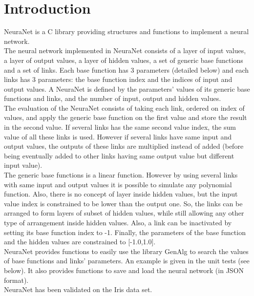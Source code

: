 \section*{Introduction}

NeuraNet is a C library providing structures and functions to implement a neural network.\\ 

The neural network implemented in NeuraNet consists of a layer of input values, a layer of output values, a layer of hidden values, a set of generic base functions and a set of links. Each base function has 3 parameters (detailed below) and each links has 3 parameters: the base function index and the indices of input and output values. A NeuraNet is defined by the parameters' values of its generic base functions and links, and the number of input, output and hidden values.\\

The evaluation of the NeuraNet consists of taking each link, ordered on index of values, and apply the generic base function on the first value and store the result in the second value. If several links has the same second value index, the sum value of all these links is used. However if several links have same input and output values, the outputs of these links are multiplied instead of added (before being eventually added to other links having same output value but different input value).\\

The generic base functions is a linear function. However by using several links with same input and output values it is possible to simulate any polynomial function. Also, there is no concept of layer inside hidden values, but the input value index is constrained to be lower than the output one. So, the links can be arranged to form layers of subset of hidden values, while still allowing any other type of arrangement inside hidden values. Also, a link can be inactivated by setting its base function index to -1. Finally, the parameters of the base function and the hidden values are constrained to [-1.0,1.0].\\

NeuraNet provides functions to easily use the library GenAlg to search the values of base functions and links' parameters. An example is given in the unit tests (see below). It also provides functions to save and load the neural network (in JSON format).\\

NeuraNet has been validated on the Iris data set.\\

